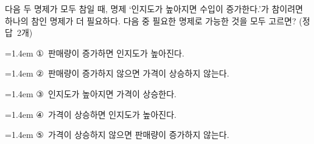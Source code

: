 다음 두 명제가 모두 참일 때, 명제 `인지도가 높아지면 수입이 증가한다.'가 참이려면 하나의 참인 명제가 더 필요하다. 다음 중 필요한 명제로 가능한 것을 모두 고르면? \mbox{(정답 2개)} 
\par\medskip\par\noindent\hangindent=1.4em {\small ①}\ 판매량이 증가하면 인지도가 높아진다.\par\noindent\hangindent=1.4em {\small ②}\ 판매량이 증가하지 않으면 가격이 상승하지 않는다.\par\noindent\hangindent=1.4em {\small ③}\ 인지도가 높아지면 가격이 상승한다.\par\noindent\hangindent=1.4em {\small ④}\ 가격이 상승하면 인지도가 높아진다.\par\noindent\hangindent=1.4em {\small ⑤}\ 가격이 상승하지 않으면 판매량이 증가하지 않는다.\par\medskip
